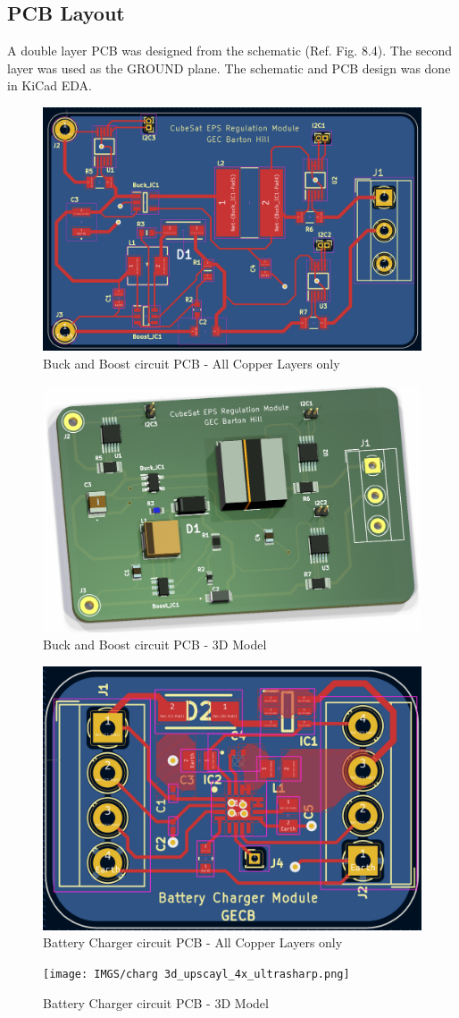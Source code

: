 \subsection{PCB Layout}
 A double layer PCB was designed from the schematic (Ref. Fig. 8.4). The second layer was used as the GROUND plane. The schematic and PCB design was done in KiCad EDA. 
 
  \begin{figure}[h]
 	\centering
 	\includegraphics[width=0.7\columnwidth]{IMGS/1 pcb.png}
 	\caption{\centering Buck and Boost circuit PCB - All Copper Layers only}
 	\label{fig:bubopcb}
 \end{figure}
 
   \begin{figure}[h]
 	\centering
 	\includegraphics[width=0.7\columnwidth]{IMGS/1 3d.png}
 	\caption{\centering Buck and Boost circuit PCB - 3D Model}
 	\label{fig:bubopcb3d}
 \end{figure}
\pagebreak
  \begin{figure}[h]
	\centering
	\includegraphics[width=0.6\columnwidth]{IMGS/charg pcb.png}
	\caption{\centering Battery Charger circuit PCB - All Copper Layers only}
	\label{fig:chargpcb}
\end{figure}
\begin{figure}[h]
	\centering	\texttt{[image: IMGS/charg 3d\_upscayl\_4x\_ultrasharp.png]}
	\caption{\centering Battery Charger circuit PCB - 3D Model}
	\label{fig:chargpcb3d}
\end{figure}


